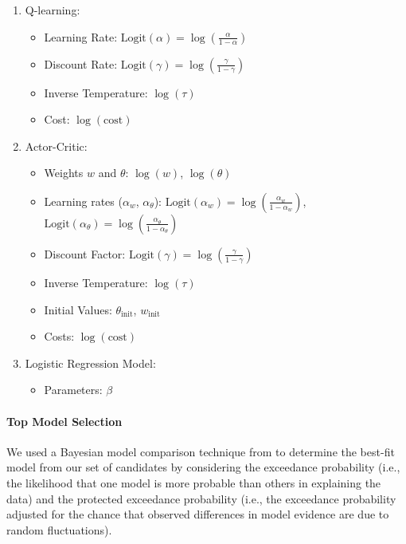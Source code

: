 \documentclass[
  number,
  preprint,
  3p,
  onecolumn]{elsarticle}
\let\oldparagraph\paragraph
\renewcommand{\paragraph}[1]{\oldparagraph{#1}\mbox{}}
\providecommand{\tightlist}{%
  \setlength{\itemsep}{0pt}\setlength{\parskip}{0pt}}\usepackage{longtable,booktabs,array}
\begin{document}
\begin{enumerate}
\def\labelenumi{\arabic{enumi}.}
\tightlist
\item
  Q-learning:

  \begin{itemize}
  \tightlist
  \item
    Learning Rate:
    \(\text{Logit}(\alpha)=\log(\frac{\alpha}{1-\alpha})\)
  \item
    Discount Rate:
    \(\text{Logit}(\gamma)=\log(\frac{\gamma}{1-\gamma})\)
  \item
    Inverse Temperature: \(\log(\tau)\)
  \item
    Cost: \(\log(\text{cost})\)
  \end{itemize}
\item
  Actor-Critic:

  \begin{itemize}
  \tightlist
  \item
    Weights \(w\) and \(\theta\): \(\log(w)\), \(\log(\theta)\)
  \item
    Learning rates (\(\alpha_w\), \(\alpha_\theta\)):
    \(\text{Logit}(\alpha_w)=\log(\frac{\alpha_w}{1-\alpha_w})\),
    \(\text{Logit}(\alpha_\theta)=\log(\frac{\alpha_\theta}{1-\alpha_\theta})\)
  \item
    Discount Factor:
    \(\text{Logit}(\gamma)=\log(\frac{\gamma}{1-\gamma})\)
  \item
    Inverse Temperature: \(\log(\tau)\)
  \item
    Initial Values: \(\theta_{\text{init}}\), \(w_{\text{init}}\)
  \item
    Costs: \(\log(\text{cost})\)
  \end{itemize}
\item
  Logistic Regression Model:

  \begin{itemize}
  \tightlist
  \item
    Parameters: \(\beta\)
  \end{itemize}
\end{enumerate}

\paragraph{Top Model Selection}\label{top-model-selection-1}

We used a Bayesian model comparison technique from \citep{piray2019a} to
determine the best-fit model from our set of candidates by considering
the exceedance probability (i.e., the likelihood that one model is more
probable than others in explaining the data) and the protected
exceedance probability (i.e., the exceedance probability adjusted for
the chance that observed differences in model evidence are due to random
fluctuations).
\end{document}
